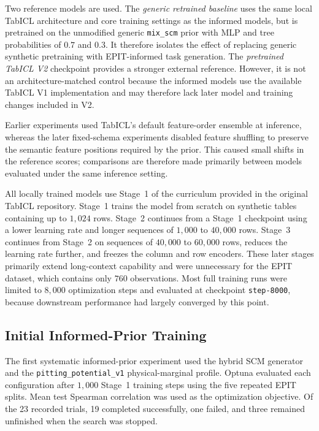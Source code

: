 \documentclass{article}
\begin{document}
Two reference models are used. The \emph{generic retrained baseline} uses the same local TabICL architecture and core training settings as the informed models, but is pretrained on the unmodified generic \texttt{mix\_scm} prior with MLP and tree probabilities of \(0.7\) and \(0.3\). It therefore isolates the effect of replacing generic synthetic pretraining with EPIT-informed task generation. The \emph{pretrained TabICL V2} checkpoint provides a stronger external reference. However, it is not an architecture-matched control because the informed models use the available TabICL V1 implementation and may therefore lack later model and training changes included in V2.

Earlier experiments used TabICL's default feature-order ensemble at inference, whereas the later fixed-schema experiments disabled feature shuffling to preserve the semantic feature positions required by the prior. This caused small shifts in the reference scores; comparisons are therefore made primarily between models evaluated under the same inference setting.

All locally trained models use Stage~1 of the curriculum provided in the original TabICL repository. Stage~1 trains the model from scratch on synthetic tables containing up to \(1{,}024\) rows. Stage~2 continues from a Stage~1 checkpoint using a lower learning rate and longer sequences of \(1{,}000\) to \(40{,}000\) rows. Stage~3 continues from Stage~2 on sequences of \(40{,}000\) to \(60{,}000\) rows, reduces the learning rate further, and freezes the column and row encoders. These later stages primarily extend long-context capability and were unnecessary for the EPIT dataset, which contains only \(760\) observations. Most full training runs were limited to \(8{,}000\) optimization steps and evaluated at checkpoint \texttt{step-8000}, because downstream performance had largely converged by this point.

\subsection{Initial Informed-Prior Training}
\label{sec:results-initial-informed}

The first systematic informed-prior experiment used the hybrid SCM generator and the \texttt{pitting\_potential\_v1} physical-marginal profile. Optuna evaluated each configuration after \(1{,}000\) Stage~1 training steps using the five repeated EPIT splits. Mean test Spearman correlation was used as the optimization objective. Of the 23 recorded trials, 19 completed successfully, one failed, and three remained unfinished when the search was stopped.
\end{document}
